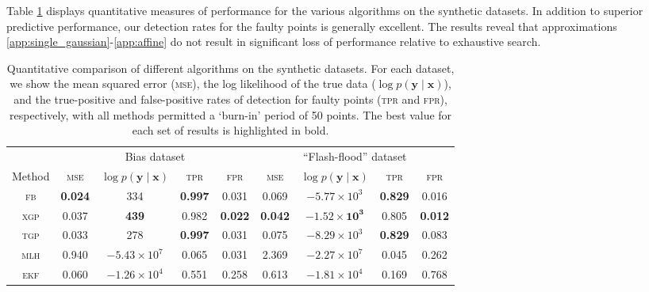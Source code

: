 \documentclass{article} %
\newcommand{\given}{\!\ensuremath{\mid}\!}
\newcommand{\bm}[1]{\ensuremath{\mathbf{#1}}}
\begin{document}
Table \ref{tbl:results} displays quantitative measures of performance
for the various algorithms on the synthetic
datasets.  
In addition to superior predictive performance, our
detection rates for the faulty points is generally excellent. The results reveal that approximations \ref{app:single_gaussian}-\ref{app:affine} do not result in significant loss of performance relative to exhaustive search.

\begin{table}
  \centering
  \caption{Quantitative comparison of different algorithms on the
    synthetic datasets.  For each dataset, we show the mean squared error
    (\textsc{mse}), the log likelihood of the true data ($\log p(\bm{y}
    \given \bm{x})$), and the true-positive and false-positive rates
    of detection for faulty points (\textsc{tpr} and \textsc{fpr}),
    respectively, with all methods permitted a `burn-in' period of 50 points. The best value for each set of results is highlighted in
    bold.}
  \label{tbl:results}
  \begin{tabular}{ccccccccc}
    \toprule
& \multicolumn{4}{c}{Bias dataset} & \multicolumn{4}{c}{``Flash-flood'' dataset}\\
    \cmidrule(l){2-5} \cmidrule(l){6-9}
    Method & \scshape{mse} & $\log p(\bm{y}\given\bm{x})$ & \scshape{tpr} & \scshape{fpr} 
& \scshape{mse} & $\log p(\bm{y}\given\bm{x})$ & \scshape{tpr} & \scshape{fpr} \\
\midrule
    \scshape{fb} & \textbf{0.024} & 334 & \textbf{0.997} & 0.031 & 0.069 & $-5.77\times 10^3$ & \textbf{0.829} & {0.016} \\
    \scshape{xgp} & 0.037 & \textbf{439} & 0.982 & \textbf{0.022} & \textbf{0.042} & $\mathbf{-1.52 \times 10^3}$ & 0.805 & \textbf{0.012} \\
    \scshape{tgp} & 0.033 & 278 & \textbf{0.997} & 0.031 & 0.075 & $-8.29\times 10^3$ & \textbf{0.829} & 0.083 \\
    \scshape{mlh} & 0.940 & $-5.43\times 10^7$ & 0.065 & 0.031 & 2.369 & $-2.27\times 10^7$ & 0.045 & 0.262 \\
   \scshape{ekf} & 0.060 & $-1.26 \times 10^4$ & 0.551 & 0.258 & 0.613 & $-1.81\times 10^4$ & 0.169 & 0.768 \\
    \bottomrule
  \end{tabular}
\end{table}
\end{document}
